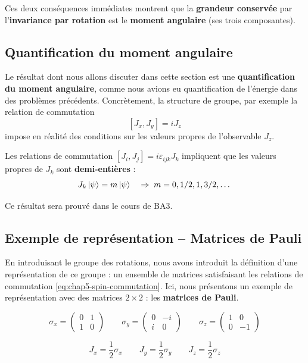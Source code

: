 \documentclass[../notesdecours.tex]{subfiles}
\begin{document}
Ces deux conséquences immédiates montrent que la \textbf{grandeur conservée} par l'\textbf{invariance par rotation} est le \textbf{moment angulaire} (ses trois composantes).

\subsection{Quantification du moment angulaire}
Le résultat dont nous allons discuter dans cette section est une \textbf{quantification du moment angulaire}, comme nous avions eu quantification de l'énergie dans des problèmes précédents. Concrètement, la structure de groupe, par exemple la relation de commutation 
$$
[J_x, J_y]=iJ_z
$$
impose en réalité des conditions sur les valeurs propres de l'observable $J_z$.

\begin{theorem}
    Les relations de commutation $[J_i, J_j] = i\varepsilon_{ijk} J_k$ impliquent que les valeurs propres de $J_k$ sont \textbf{demi-entières} : 
    $$J_k \ket \psi = m\ket \psi \quad \Rightarrow \; m=0, 1/2, 1, 3/2, \dots$$
\end{theorem}

Ce résultat sera prouvé dans le cours de BA3.
\subsection{Exemple de représentation -- Matrices de Pauli}
En introduisant le groupe des rotations, nous avons introduit la définition d'une représentation de ce groupe : un ensemble de matrices satisfaisant les relations de commutation \ref{eq:chap5-spin-commutation}. Ici, nous présentons un exemple de représentation avec des matrices $2\times2$ : les \textbf{matrices de Pauli}. 

$$
\sigma_x = \left(
    \begin{array}{cc}
        0&1 \\
        1&0
    \end{array}
    \right)
\qquad 
\sigma_y = \left(
    \begin{array}{cc}
        0&-i \\
        i&0
    \end{array}
    \right)
\qquad 
\sigma_z = \left(
    \begin{array}{cc}
        1&0 \\
        0&-1
    \end{array}
    \right)
$$
 
$$J_x = \dfrac{1}{2}\sigma_x \qquad J_y = \dfrac{1}{2}\sigma_y \qquad J_z = \dfrac{1}{2}\sigma_z$$
\end{document}
